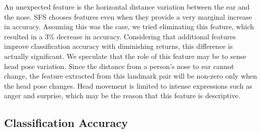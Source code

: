 \documentclass[hyperfootnotes=false]{article}
\begin{document}
An unexpected feature is the horizontal distance variation between the ear and the nose.
SFS chooses features even when they provide a very marginal increase in accuracy.
Assuming this was the case, we tried eliminating this feature, which resulted in a 3\% decrease in accuracy.
Considering that additional features improve classification accuracy with diminishing returns, this difference is actually significant.
We speculate that the role of this feature may be to sense head pose variation.
Since the distance from a person's nose to ear cannot change, the feature extracted from this landmark pair will be non-zero only when the head pose changes.
Head movement is limited to intense expressions such as anger and surprise, which may be the reason that this feature is descriptive.

\subsection{Classification Accuracy}
\end{document}

